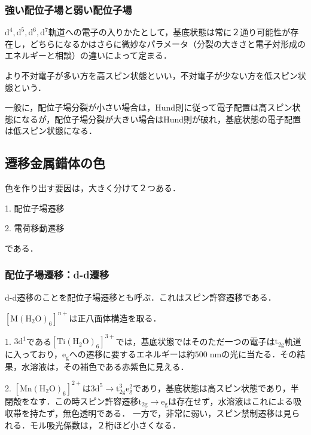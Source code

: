 \documentclass[uplatex, dvipdfmx]{jsreport}
\begin{document}
\subsubsection{強い配位子場と弱い配位子場}

\begin{theory}
    $\mathrm{d^4,d^5,d^6,d^7}$軌道への電子の入りかたとして，基底状態は常に２通り可能性が存在し，どちらになるかはさらに微妙なパラメータ（分裂の大きさと電子対形成のエネルギーと相談）の違いによって定まる．

    より不対電子が多い方を高スピン状態といい，不対電子が少ない方を低スピン状態という．

    一般に，配位子場分裂が小さい場合は，Hund則に従って電子配置は高スピン状態になるが，配位子場分裂が大きい場合はHund則が破れ，基底状態の電子配置は低スピン状態になる．
\end{theory}

\subsection{遷移金属錯体の色}

色を作り出す要因は，大きく分けて２つある．

1. 配位子場遷移

2. 電荷移動遷移

である．

\subsubsection{配位子場遷移：d-d遷移}

\begin{theory}
    d-d遷移のことを配位子場遷移とも呼ぶ．これはスピン許容遷移である．
\end{theory}

\begin{example}[アクア錯イオン]$[\mathrm{M(H_2O)_6}]^{n+}$は正八面体構造を取る．
    
    1. $\mathrm{3d}^1$である$[\mathrm{Ti(H_2O)_6}]^{3+}$では，基底状態ではそのただ一つの電子は$\mathrm{t_{2g}}$軌道に入っており，$\mathrm{e_g}$への遷移に要するエネルギーは約$500\;\mathrm{nm}$の光に当たる．その結果，水溶液は，その補色である赤紫色に見える．

    2. $[\mathrm{Mn(H_2O)_6}]^{2+}$は$\mathrm{3d}^5\to\mathrm{t_{2g}^3}\mathrm{e_g^2}$であり，基底状態は高スピン状態であり，半閉殻をなす．この時スピン許容遷移$\mathrm{t_{2g}}\to\mathrm{e_g}$は存在せず，水溶液はこれによる吸収帯を持たず，無色透明である．
    一方で，非常に弱い，スピン禁制遷移は見られる．モル吸光係数は，２桁ほど小さくなる．
\end{example}
\end{document}
